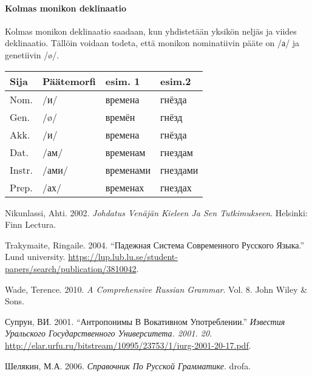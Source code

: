 \documentclass[]{scrartcl}
\begin{document}
\paragraph{Kolmas monikon deklinaatio}\label{kolmas-monikon-deklinaatio}

Kolmas monikon deklinaatio saadaan, kun yhdistetään yksikön neljäs ja
viides deklinaatio. Tällöin voidaan todeta, että monikon nominatiivin
pääte on /а/ ja genetiivin /ø/.

\begin{longtable}[c]{@{}llll@{}}
\toprule
Sija & Päätemorfi & esim. 1 & esim.2\tabularnewline
\midrule
\endhead
Nom. & /и/ & времена & гнёзда\tabularnewline
Gen. & /ø/ & времён & гнёзд\tabularnewline
Akk. & /и/ & времена & гнёзда\tabularnewline
Dat. & /ам/ & временам & гнездам\tabularnewline
Instr. & /ами/ & временами & гнездами\tabularnewline
Prep. & /ах/ & временах & гнездах\tabularnewline
\bottomrule
\end{longtable}

Nikunlassi, Ahti. 2002. \emph{Johdatus Venäjän Kieleen Ja Sen
Tutkimukseen}. Helsinki: Finn Lectura.

Trakymaite, Ringaile. 2004. ``Падежная Система Современного Русского
Языка.'' Lund university.
\url{https://lup.lub.lu.se/student-papers/search/publication/3810042}.

Wade, Terence. 2010. \emph{A Comprehensive Russian Grammar}. Vol. 8.
John Wiley \& Sons.

Супрун, ВИ. 2001. ``Антропонимы В Вокативном Употреблении.''
\emph{Известия Уральского Государственного Университета. 2001. 20}.
\url{http://elar.urfu.ru/bitstream/10995/23753/1/iurg-2001-20-17.pdf}.

Шелякин, М.А. 2006. \emph{Справочник По Русской Грамматике}. drofa.
\end{document}
